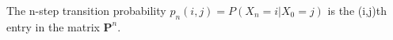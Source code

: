 \documentclass{tufte-handout}
\makeatletter
\renewcommand{\section}{\@startsection{section}%
    {3}{-1.01em}{-3ex \@plus -1ex \@minus -.2ex}%
    {1.5ex \@plus .2ex}
    {\hspace*{-5.5em}\fcolorbox{blue}{blue}{\parbox[c][1.0ex][b]{4em}{\phantom{space}}}
    \normalfont\Large\itshape\color{blue}}}
\makeatother
\begin{document}
    \begin{Definition}
        The n-step transition probability $ p_n(i,j)=P(X_n = i |X_0 = j) $
         is the (i,j)th entry in the matrix $ \mathbf{P}^n $.
    \end{Definition}





\makeatletter
  \renewcommand{\section}{\@startsection{section}%
    {3}{0.8em}{-3ex \@plus -1ex \@minus -.2ex}%
    {1.5ex \@plus .2ex}
    {\hspace*{-5.5em}\fcolorbox{Periwinkle}{Periwinkle}{\parbox[c][1.0ex][b]{4em}{\phantom{space}}}
    \normalfont\Large\itshape\color{blue}}}
\makeatother



\end{document}
